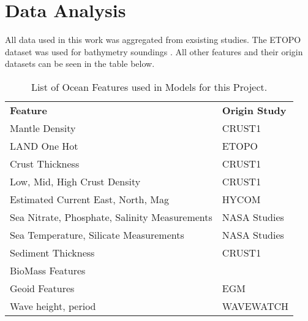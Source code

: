 \section{Data Analysis}
\setlength{\parindent}{10ex}

All data used in this work was aggregated from exsisting studies.
The ETOPO dataset was used for bathymetry soundings \cite{national1988etopo}.
All other features and their origin datasets can be seen in the table below. %

%

\begin{center}
    \begin{table}[htb]
        \begin{tabular}{ |p{} p{}| }
            \hline
                \textbf{Feature} & \textbf{Origin Study} \\
                Mantle Density & CRUST1 \cite{laske2013update} \\
                LAND One Hot & ETOPO \cite{national1988etopo} \\
                Crust Thickness & CRUST1 \cite{laske2013update} \\
                Low, Mid, High Crust Density & CRUST1 \cite{laske2013update} \\
                Estimated Current East, North, Mag & HYCOM \cite{chassignet2009us} \\
                Sea Nitrate, Phosphate, Salinity Measurements & NASA Studies \cite{meissner2018salinity} \cite{parekh2005decoupling}  \\
                Sea Temperature, Silicate Measurements & NASA Studies \\
                Sediment Thickness & CRUST1 \cite{laske2013update} \\
                BioMass Features & \cite{wei2010global} \\
                Geoid Features & EGM \cite{pavlis2008earth} \\
                Wave height, period & WAVEWATCH \cite{tolman20072007} \\
            \hline
        \end{tabular}
        \label{table:FEATURE_LIST}
        \caption{List of Ocean Features used in Models for this Project.}
    \end{table}
\end{center}
